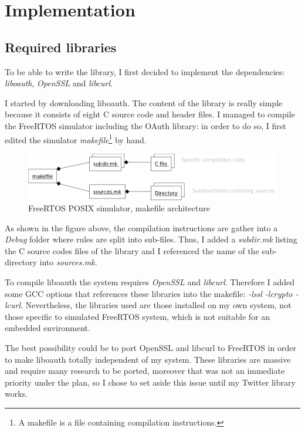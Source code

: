 \chapter{Implementation}

\section{Required libraries}

\hspace{15mm}To be able to write the library, I first decided to implement the dependencies: \textit{liboauth}, \textit{OpenSSL} and \textit{libcurl}.

I started by downloading liboauth. The content of the library is really simple because it consists of eight C source code and header files. I managed to compile the FreeRTOS simulator including the OAuth library: in order to do so, I first edited the simulator \textit{makefile}\footnote{A makefile is a file containing compilation instructions.} by hand.

\begin{figure}[h]
  \centering
  \includegraphics[scale=0.75]{images/makefile.png}
  \caption{FreeRTOS POSIX simulator, makefile architecture}
\end{figure}

As shown in the figure above, the compilation instructions are gather into a \textit{Debug} folder where rules are split into sub-files. Thus, I added a \textit{subdir.mk} listing the C source codes files of the library and I referenced the name of the sub-directory into \textit{sources.mk}.

To compile liboauth the system requires \textit{OpenSSL} and \textit{libcurl}. Therefore I added some GCC options that references these libraries into the makefile: \textit{-lssl -lcrypto -lcurl}. Nevertheless, the libraries used are those installed on my own system, not those specific to simulated FreeRTOS system, which is not suitable for an embedded environment.

The best possibility could be to port OpenSSL and libcurl to FreeRTOS in order to make liboauth totally independent of my system. These libraries are massive and require many research to be ported, moreover that was not an immediate priority under the plan, so I chose to set aside this issue until my Twitter library works.


